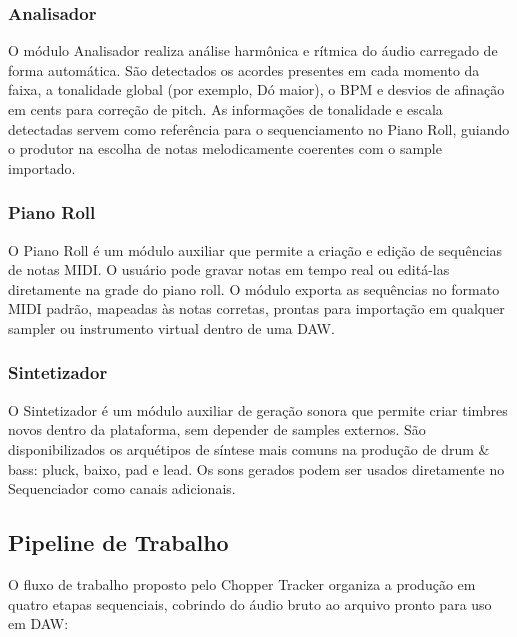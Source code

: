 \documentclass[portuguese]{sbc2025}
\begin{document}
\subsubsection{Analisador}

O módulo Analisador realiza análise harmônica e rítmica do áudio carregado de forma automática. São detectados os acordes presentes em cada momento da faixa, a tonalidade global (por exemplo, Dó maior), o BPM e desvios de afinação em cents para correção de pitch. As informações de tonalidade e escala detectadas servem como referência para o sequenciamento no Piano Roll, guiando o produtor na escolha de notas melodicamente coerentes com o sample importado.

\subsubsection{Piano Roll}

O Piano Roll é um módulo auxiliar que permite a criação e edição de sequências de notas MIDI. O usuário pode gravar notas em tempo real ou editá-las diretamente na grade do piano roll. O módulo exporta as sequências no formato MIDI padrão, mapeadas às notas corretas, prontas para importação em qualquer sampler ou instrumento virtual dentro de uma DAW.

\subsubsection{Sintetizador}

O Sintetizador é um módulo auxiliar de geração sonora que permite criar timbres novos dentro da plataforma, sem depender de samples externos. São disponibilizados os arquétipos de síntese mais comuns na produção de drum \& bass: pluck, baixo, pad e lead. Os sons gerados podem ser usados diretamente no Sequenciador como canais adicionais.

\subsection{Pipeline de Trabalho}

O fluxo de trabalho proposto pelo Chopper Tracker organiza a produção em quatro etapas sequenciais, cobrindo do áudio bruto ao arquivo pronto para uso em DAW:
\end{document}
